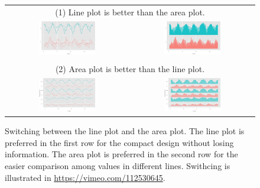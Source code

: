 \documentclass[12pt]{article}
\providecommand{\tabularnewline}{\\}
\begin{document}
\begin{itemize}
\begin{figure}[H]
\begin{centering}
\begin{tabular}{cc}
\multicolumn{2}{c}{{\scriptsize{ (1) Line plot is better than the area plot.}}}\tabularnewline
\includegraphics[width=0.48\textwidth]{graph/pipeline-14-6} & \includegraphics[width=0.48\textwidth]{graph/pipeline-14-8}\tabularnewline
 & \tabularnewline
\multicolumn{2}{c}{{\scriptsize{ (2) Area plot is better than the line plot.}}}\tabularnewline
\includegraphics[width=0.48\textwidth]{graph/pipeline-14-7} & \includegraphics[width=0.48\textwidth]{graph/pipeline-14-9}\tabularnewline
\end{tabular}
\par\end{centering}

\caption{\label{fig:switching-layers}Switching between the line plot and the
area plot. The line plot is preferred in the first row for the compact
design without losing information. The area plot is preferred in the
second row for the easier comparison among values in different lines. Swithcing is illustrated in \url{https://vimeo.com/112530645}. }
\end{figure}

\end{itemize}
\end{document}
